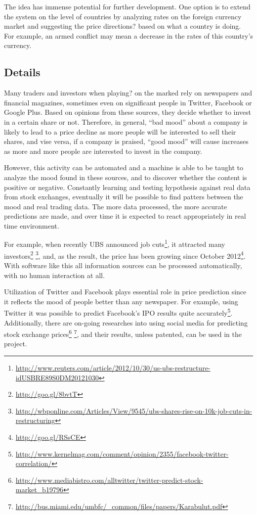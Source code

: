 \documentclass[a4paper,12pt]{article}
\begin{document}
The idea has immense potential for further development. One option is to extend the system on the level of countries by analyzing rates on the foreign currency market and suggesting the price directions? based on what a country is doing. For example, an armed conflict may mean a decrease in the rates of this country's currency.

\subsection*{Details}

Many traders and investors when playing? on the marked rely on newspapers and financial magazines, sometimes even on significant people in Twitter, Facebook or Google Plus. Based on opinions from these sources, they decide whether to invest in a certain share or not. Therefore, in general, ``bad mood'' about a company is likely to lead to a price decline as more people will be interested to sell their shares, and vise versa, if a company is praised, ``good mood'' will cause increases as more and more people are interested to invest in the company.

However, this activity can be automated and a machine is able to be taught to analyze the mood found in these sources, and to discover whether the content is positive or negative. Constantly learning and testing hypothesis against real data from stock exchanges, eventually it will be possible to find patters between the mood and real trading data. The more data processed, the more accurate predictions are made, and over time it is expected to react appropriately in real time environment.

For example, when recently UBS announced job cuts\footnote{\url{http://www.reuters.com/article/2012/10/30/us-ubs-restructure-idUSBRE89S0DM20121030}}, it attracted many investors\footnote{\url{http://goo.gl/8bvtT}} \footnote{\url{http://wbponline.com/Articles/View/9545/ubs-shares-rise-on-10k-job-cuts-in-restructuring}}, and, as the result, the price has been growing since October 2012\footnote{\url{http://goo.gl/RSsCE}}. With software like this all information sources can be processed automatically, with no human interaction at all.

Utilization of Twitter and Facebook plays essential role in price prediction since it reflects the mood of people better than any newspaper. For example, using Twitter it was possible to predict Facebook's IPO results quite accurately\footnote{\url{http://www.kernelmag.com/comment/opinion/2355/facebook-twitter-correlation/}}. Additionally, there are on-going researches into using social media for predicting stock exchange prices\footnote{\url{http://www.mediabistro.com/alltwitter/twitter-predict-stock-market_b19796}} \footnote{\url{http://bus.miami.edu/umbfc/_common/files/papers/Karabulut.pdf}}, and their results, unless patented, can be used in the project.
\end{document}
